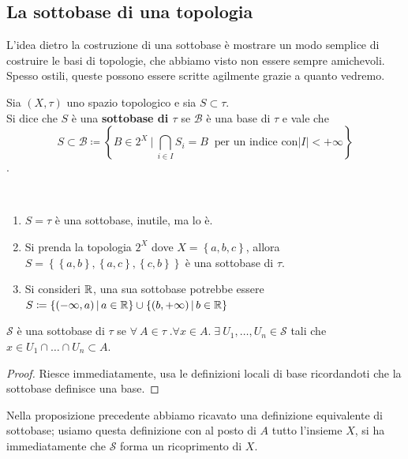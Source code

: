 \newpage
\subsection{\textcolor{TopGener}{\textbf{La sottobase di una topologia}}}



L'idea dietro la costruzione di una sottobase è mostrare un modo semplice di costruire le basi di topologie, che abbiamo visto non essere sempre amichevoli. Spesso ostili, queste possono essere scritte agilmente grazie a quanto vedremo.

\begin{definition}
	Sia $(X,\tau)$ uno spazio topologico e sia $S \subset \tau$. \\ Si dice che $S$ è una \textbf{sottobase di $\tau$} se $\mathcal{B}$ è una base di $\tau$ e vale che
	\begin{equation*}
		S \subset \mathcal{B} \coloneqq \left\{ B \in 2^X \ \Big|\ \bigcap_{i \in I} S_i = B \ \text{ per un indice con} |I| < +\infty \right\}
	\end{equation*}
	.
\end{definition}

\begin{example}\
\begin{enumerate}
	\item $S = \tau$ è una sottobase, inutile, ma lo è.
	\item Si prenda la topologia $2^X$ dove $X = \left\{a,b,c\right\}$, allora $S = \left\{\left\{a,b\right\},\left\{a,c\right\},\left\{c,b\right\}\right\}$ è una sottobase di $\tau$.
	\item Si consideri $\mathbb{R}$, una sua sottobase potrebbe essere $S \coloneqq \left\{(-\infty, a) \,\middle|\, a \in \mathbb{R}\right\} \cup \left\{(b, +\infty) \,\middle|\, b \in \mathbb{R}\right\}$
\end{enumerate}
\end{example}

\begin{proposition}
	$\mathcal{S}$ è una sottobase di $\tau$ se $\forall \ A \in \tau \; . \forall x \in A . \; \exists \ U_1, \dots, U_n \in \mathcal{S}$ tali che $x \in U_1 \cap \dots \cap U_n \subset A$. 
\end{proposition}
\begin{proof}
	Riesce immediatamente, usa le definizioni locali di base ricordandoti che la sottobase definisce una base.
\end{proof}

\begin{remark}
	Nella proposizione precedente abbiamo ricavato una definizione equivalente di sottobase; usiamo questa definizione con al posto di $A$ tutto l'insieme $X$, si ha immediatamente che $\mathcal{S}$ forma un ricoprimento di $X$.
\end{remark}

